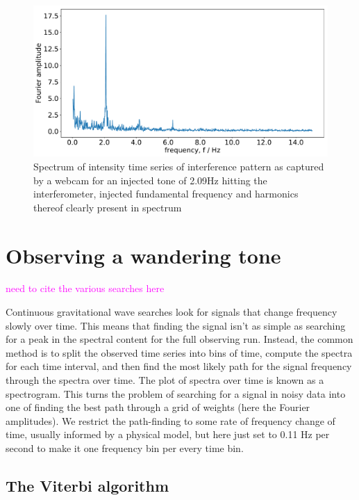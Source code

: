 \documentclass[prb,preprint]{revtex4-1}
\newcommand{\jam}{\textcolor{magenta}}
\begin{document}
\begin{figure}
	\includegraphics[width=\textwidth]{figures/webcam_expt_4_0209-cropped.pdf}
	\caption{Spectrum of intensity time series of interference pattern as captured by a webcam for an injected tone of 2.09Hz hitting the interferometer, injected fundamental frequency and harmonics thereof clearly present in spectrum}
	\label{fig:webcam_spectrum}
\end{figure}

\section{Observing a wandering tone}
\label{sec:viterbi_wandering}

\jam{need to cite the various searches here}

Continuous gravitational wave searches look for signals that change frequency slowly over time. This means that finding the signal isn’t as simple as searching for a peak in the spectral content for the full observing run.
Instead, the common method is to split the observed time series into bins of time, compute the spectra for each time interval, and then find the most likely path for the signal frequency through the spectra over time. The plot of spectra over time is known as a spectrogram.
This turns the problem of searching for a signal in noisy data into one of finding the best path through a grid of weights (here the Fourier amplitudes). We restrict the path-finding to some rate of frequency change of time, usually informed by a physical model, but here just set to 0.11 Hz per second to make it one frequency bin per every time bin.


\subsection{The Viterbi algorithm}
\end{document}
